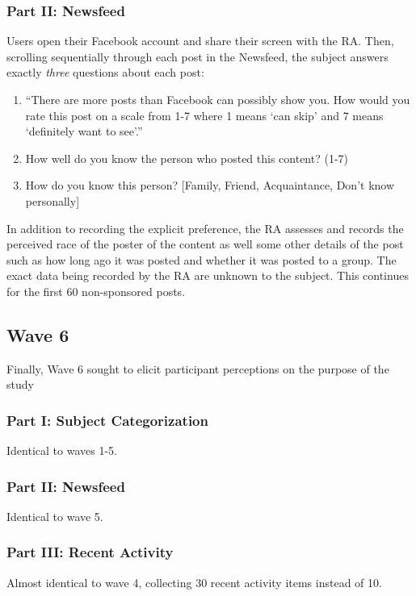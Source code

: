 \documentclass[12pt,letterpaper]{article}
\begin{document}
\subsubsection{Part II: Newsfeed} Users open their Facebook account and share their screen with the RA. Then, scrolling sequentially through each post in the Newsfeed, the subject answers exactly \textit{three} questions about each post: 
\begin{enumerate}
    \item “There are more posts than Facebook can possibly show you. How would you rate this post on a scale from 1-7 where 1 means ‘can skip’ and 7 means ‘definitely want to see’.” 
    \item How well do you know the person who posted this content? (1-7)
    \item How do you know this person? [Family, Friend, Acquaintance, Don’t know personally]
\end{enumerate}

In addition to recording the explicit preference, the RA assesses and records the perceived race of the poster of the content as well some other details of the post such as how long ago it was posted and whether it was posted to a group. The exact data being recorded by the RA are unknown to the subject. This continues for the first 60 non-sponsored posts.

\subsection{Wave 6}

Finally, Wave 6 sought to elicit participant perceptions on the purpose of the study 

\subsubsection{Part I: Subject Categorization} Identical to waves 1-5.

\subsubsection{Part II: Newsfeed}  Identical to wave 5.

\subsubsection{Part III: Recent Activity} Almost identical to wave 4, collecting 30 recent activity items instead of 10.
\end{document}
